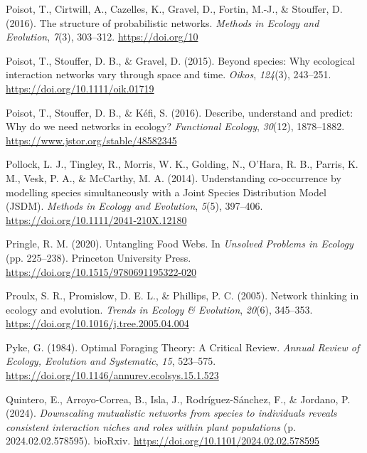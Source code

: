 \documentclass[
]{article}
\newlength{\cslhangindent}
\newenvironment{CSLReferences}[2] %
 {\begin{list}{}{%
  \setlength{\itemindent}{0pt}
  \setlength{\leftmargin}{0pt}
  \setlength{\parsep}{0pt}
  \ifodd #1
   \setlength{\leftmargin}{\cslhangindent}
   \setlength{\itemindent}{-1\cslhangindent}
  \fi
  \setlength{\itemsep}{#2\baselineskip}}}
 {\end{list}}
\begin{document}
\begin{CSLReferences}{1}{0}
Poisot, T., Cirtwill, A., Cazelles, K., Gravel, D., Fortin, M.-J., \&
Stouffer, D. (2016). The structure of probabilistic networks.
\emph{Methods in Ecology and Evolution}, \emph{7}(3), 303--312.
\url{https://doi.org/10}

Poisot, T., Stouffer, D. B., \& Gravel, D. (2015). Beyond species: Why
ecological interaction networks vary through space and time.
\emph{Oikos}, \emph{124}(3), 243--251.
\url{https://doi.org/10.1111/oik.01719}

Poisot, T., Stouffer, D. B., \& Kéfi, S. (2016). Describe, understand
and predict: Why do we need networks in ecology? \emph{Functional
Ecology}, \emph{30}(12), 1878--1882.
\url{https://www.jstor.org/stable/48582345}

Pollock, L. J., Tingley, R., Morris, W. K., Golding, N., O'Hara, R. B.,
Parris, K. M., Vesk, P. A., \& McCarthy, M. A. (2014). Understanding
co-occurrence by modelling species simultaneously with a {Joint Species
Distribution Model} ({JSDM}). \emph{Methods in Ecology and Evolution},
\emph{5}(5), 397--406. \url{https://doi.org/10.1111/2041-210X.12180}

Pringle, R. M. (2020). Untangling {Food Webs}. In \emph{Unsolved
{Problems} in {Ecology}} (pp. 225--238). Princeton University Press.
\url{https://doi.org/10.1515/9780691195322-020}

Proulx, S. R., Promislow, D. E. L., \& Phillips, P. C. (2005). Network
thinking in ecology and evolution. \emph{Trends in Ecology \&
Evolution}, \emph{20}(6), 345--353.
\url{https://doi.org/10.1016/j.tree.2005.04.004}

Pyke, G. (1984). Optimal {Foraging Theory}: {A Critical Review}.
\emph{Annual Review of Ecology, Evolution and Systematic}, \emph{15},
523--575. \url{https://doi.org/10.1146/annurev.ecolsys.15.1.523}

Quintero, E., Arroyo-Correa, B., Isla, J., Rodríguez-Sánchez, F., \&
Jordano, P. (2024). \emph{Downscaling mutualistic networks from species
to individuals reveals consistent interaction niches and roles within
plant populations} (p. 2024.02.02.578595). bioRxiv.
\url{https://doi.org/10.1101/2024.02.02.578595}


\end{CSLReferences}
\end{document}
